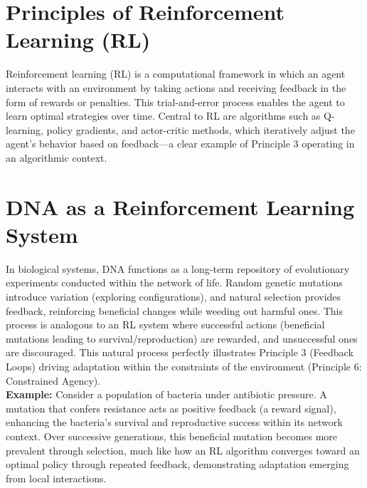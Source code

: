 \documentclass[12pt,openany]{book}
\begin{document}
\section{Principles of Reinforcement Learning (RL)}
Reinforcement learning (RL) is a computational framework in which an agent interacts with an environment by taking actions and receiving feedback in the form of rewards or penalties. This trial-and-error process enables the agent to learn optimal strategies over time. Central to RL are algorithms such as Q-learning, policy gradients, and actor-critic methods, which iteratively adjust the agent's behavior based on feedback—a clear example of Principle 3 operating in an algorithmic context. %

\section{DNA as a Reinforcement Learning System}
In biological systems, DNA functions as a long-term repository of evolutionary experiments conducted within the network of life. Random genetic mutations introduce variation (exploring configurations), and natural selection provides feedback, reinforcing beneficial changes while weeding out harmful ones. This process is analogous to an RL system where successful actions (beneficial mutations leading to survival/reproduction) are rewarded, and unsuccessful ones are discouraged. This natural process perfectly illustrates Principle 3 (Feedback Loops) driving adaptation within the constraints of the environment (Principle 6: Constrained Agency). \\[1ex] %
\textbf{Example:} Consider a population of bacteria under antibiotic pressure. A mutation that confers resistance acts as positive feedback (a reward signal), enhancing the bacteria's survival and reproductive success within its network context. Over successive generations, this beneficial mutation becomes more prevalent through selection, much like how an RL algorithm converges toward an optimal policy through repeated feedback, demonstrating adaptation emerging from local interactions.
\end{document}
